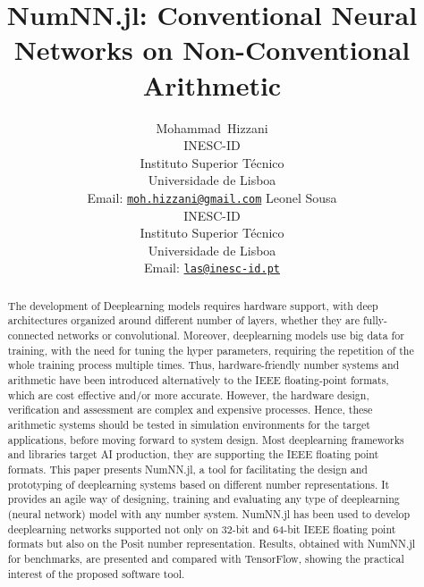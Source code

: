 \documentclass{article}
\title{NumNN.jl: Conventional Neural Networks on Non-Conventional Arithmetic}
\author{%
	{Mohammad~Hizzani}\\
	INESC-ID\\ 
	Instituto Superior Técnico\\ 
		Universidade de Lisboa\\
		Email: \href{mailto:moh.hizzani@gmail.com}{\tt moh.hizzani@gmail.com}%
	\And
	{Leonel Sousa}\\
	INESC-ID\\ 
		Instituto Superior Técnico\\ 
		Universidade de Lisboa\\
		Email: \href{mailto:las@inesc-id.pt}{\tt las@inesc-id.pt}%
}
\begin{document}
	\maketitle

	\begin{abstract}
		The development of Deeplearning models requires hardware support, with deep architectures organized around different number of layers, whether they are fully-connected networks or convolutional. Moreover, deeplearning models use big data for training, with the need for tuning the hyper parameters, requiring the repetition of the whole training process multiple times. Thus, hardware-friendly number systems and arithmetic have been introduced alternatively to the IEEE floating-point formats, which are cost effective and/or more accurate. However, the hardware design, verification and assessment are complex and expensive processes. Hence, these arithmetic systems should be tested in simulation environments for the target applications, before moving forward to system design. Most deeplearning frameworks and libraries target AI production, they are supporting the IEEE floating point formats. This paper presents NumNN.jl, a tool for facilitating the design and prototyping of deeplearning systems based on different number representations. It provides an agile way of designing, training and evaluating any type of deeplearning (neural network) model with any number system. NumNN.jl has been used to develop deeplearning networks supported not only on 32-bit and 64-bit IEEE floating point formats but also on the Posit number representation.  Results, obtained with NumNN.jl for benchmarks, are presented and compared with TensorFlow, showing the practical interest of the proposed software tool.
	\end{abstract}

	
	
	
	
	
%	
	
	
	
\end{document}
